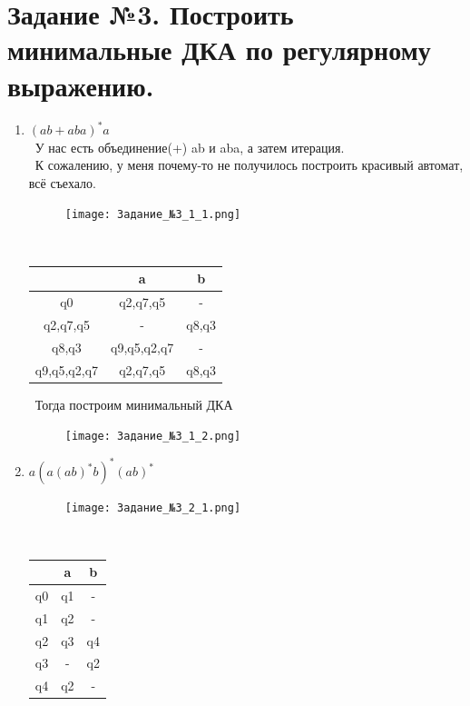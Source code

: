 \documentclass[a4paper]{article}
\begin{document}
\section{Задание №3. Построить минимальные ДКА по регулярному выражению.}
\begin{enumerate}
\item $(ab+aba)^*a$\\
\ У нас есть объединение(+) ab и aba, а затем итерация. \\
\ К сожалению, у меня почему-то не получилось построить красивый автомат, всё съехало. \\
\begin{figure}[h]
\centering
\texttt{[image: Задание\_№3\_1\_1.png]}
\end{figure}
\\
\begin{tabular}{|*{3}{c|}}
\textbf{ } & a & b \\
\hline\hline
q0 & q2,q7,q5 & - \\
\hline\hline
q2,q7,q5 & - & q8,q3 \\
\hline\hline
q8,q3 & q9,q5,q2,q7 & - \\
\hline\hline
q9,q5,q2,q7 & q2,q7,q5 & q8,q3 \\
\end{tabular}

\ Тогда построим минимальный ДКА \\
\begin{figure}[h]
\centering
\texttt{[image: Задание\_№3\_1\_2.png]}
\end{figure}

\item $a(a(ab)^*b)^*(ab)^*$\\

\begin{figure}[h]
\centering
\texttt{[image: Задание\_№3\_2\_1.png]}
\end{figure}
\\
\begin{tabular}{|*{3}{c|}}
\textbf{ } & a & b \\
\hline\hline
q0 & q1 & - \\
\hline\hline
q1 & q2 & - \\
\hline\hline
q2 & q3 & q4 \\
\hline\hline
q3 & - & q2 \\
\hline\hline
q4 & q2 & - \\
\end{tabular}
\\



\end{enumerate}
\end{document}
